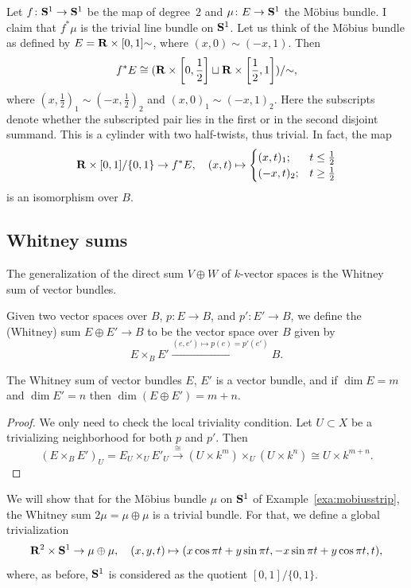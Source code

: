 \documentclass[a4paper,openany]{scrbook}
\begin{document}
\begin{example}
Let $f\colon \S^1 \to \S^1$ be the map of degree~$2$ and $\mu\colon E \to \S^1$ the Möbius bundle. I claim that $f^*\mu$ is the trivial line bundle on $\S^1$. Let us think of the Möbius bundle as defined by $E = \R \times [0,1]\mathord\sim$, where $(x,0) \sim (-x,1)$. Then
\[
f^*E \cong (\R \times \left[0,\frac12\right] \sqcup \R \times \left[\frac12,1\right])/\mathord\sim,
\]
where $(x,\frac12)_1 \sim (-x,\frac12)_2$ and $(x,0)_1 \sim (-x,1)_2$. Here the subscripts denote whether the subscripted pair lies in the first or in the second disjoint summand. This is a cylinder with two half-twists, thus trivial. In fact, the map
\[
\R \times [0,1]/\{0,1\} \to f^*E, \quad (x,t) \mapsto \begin{cases} (x,t)_1; & t \leq \frac12\\(-x,t)_2; & t \geq \frac12\end{cases}
\]
is an isomorphism over $B$.

\end{example}


\subsection{Whitney sums} \label{ssec:whitneysums}

The generalization of the direct sum $V \oplus W$ of $k$-vector spaces is the Whitney sum of vector bundles.

\begin{defn}
Given two vector spaces over $B$, $p\colon E \to B$, and $p'\colon E' \to B$, we define the (Whitney) sum $E \oplus E' \to B$ to be the vector space over $B$ given by 
\[
E \times_B E' \xrightarrow{(e,e') \mapsto p(e) = p'(e')} B.
\]
\end{defn}

\begin{lemma}
The Whitney sum of vector bundles $E$, $E'$ is a vector bundle, and if $\dim E = m$ and $\dim E' = n$ then $\dim(E\oplus E') = m+n$.
\end{lemma}

\begin{proof}
We only need to check the local triviality condition. Let $U \subset X$ be a trivializing neighborhood for both $p$ and $p'$. Then
\[
(E \times_B E')_U = E_U \times_U E'_U \xrightarrow{\cong} (U \times k^m) \times_U (U \times k^n) \cong U \times k^{m+n}.
\]
\end{proof}

\begin{example}
We will show that for the Möbius bundle $\mu$ on $\S^1$ of Example~\ref{exa:mobiusstrip}, the Whitney sum $2\mu = \mu \oplus \mu$ is a trivial bundle. For that, we define a global trivialization
\[
\R^2 \times \S^1 \to \mu \oplus \mu, \quad (x,y,t) \mapsto (x \cos \pi t + y \sin \pi t,-x \sin \pi t + y \cos \pi t,t),
\]
where, as before, $\S^1$ is considered as the quotient $[0,1]/\{0,1\}$.
\end{example}
\end{document}
